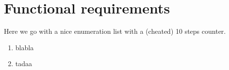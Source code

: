 \section{Functional requirements}

Here we go with a nice enumeration list with a (cheated) 10 steps counter.

\begin{enumerate}
  \item blabla
  \item tadaa
\end{enumerate}